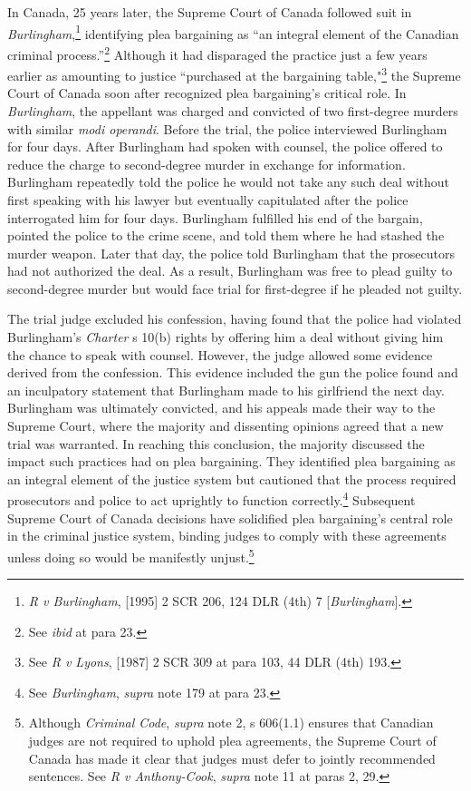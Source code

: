 In Canada, 25 years later, the Supreme Court of Canada followed suit in \textit{Burlingham},\footnote{\textit{R v Burlingham}, [1995] 2 SCR 206, 124 DLR (4th) 7 [\textit{Burlingham}].} identifying plea bargaining as ``an integral element of the Canadian criminal process.''\footnote{See \textit{ibid} at para 23.} Although it had disparaged the practice just a few years earlier as amounting to justice ``purchased at the bargaining table,"\footnote{See \textit{R v Lyons}, [1987] 2 SCR 309 at para 103, 44 DLR (4th) 193.} the Supreme Court of Canada soon after recognized plea bargaining's critical role. In \textit{Burlingham}, the appellant was charged and convicted of two first-degree murders with similar \textit{modi operandi}. Before the trial, the police interviewed Burlingham for four days. After Burlingham had spoken with counsel, the police offered to reduce the charge to second-degree murder in exchange for information. Burlingham repeatedly told the police he would not take any such deal without first speaking with his lawyer but eventually capitulated after the police interrogated him for four days. Burlingham fulfilled his end of the bargain, pointed the police to the crime scene, and told them where he had stashed the murder weapon. Later that day, the police told Burlingham that the prosecutors had not authorized the deal. As a result, Burlingham was free to plead guilty to second-degree murder but would face trial for first-degree if he pleaded not guilty.

The trial judge excluded his confession, having found that the police had violated Burlingham's \textit{Charter} s 10(b) rights by offering him a deal without giving him the chance to speak with counsel. However, the judge allowed some evidence derived from the confession. This evidence included the gun the police found and an inculpatory statement that Burlingham made to his girlfriend the next day. Burlingham was ultimately convicted, and his appeals made their way to the Supreme Court, where the majority and dissenting opinions agreed that a new trial was warranted. In reaching this conclusion, the majority discussed the impact such practices had on plea bargaining. They identified plea bargaining as an integral element of the justice system but cautioned that the process required prosecutors and police to act uprightly to function correctly.\footnote{See \textit{Burlingham}, \textit{supra} note 179 at para 23.} Subsequent Supreme Court of Canada decisions have solidified plea bargaining's central role in the criminal justice system, binding judges to comply with these agreements unless doing so would be manifestly unjust.\footnote{Although \textit{Criminal Code}, \textit{supra} note 2, s 606(1.1) ensures that Canadian judges are not required to uphold plea agreements, the Supreme Court of Canada has made it clear that judges must defer to jointly recommended sentences. See \textit{R v Anthony-Cook}, \textit{supra} note 11 at paras 2, 29.}


